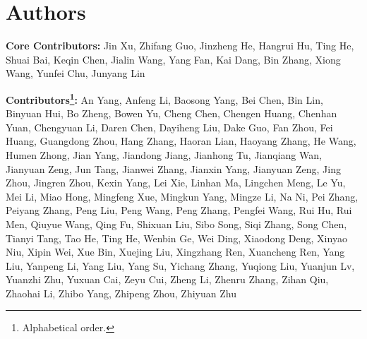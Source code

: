 \section{Authors}
\textbf{Core Contributors:} Jin Xu, Zhifang Guo, Jinzheng He, Hangrui Hu, Ting He, Shuai Bai, Keqin Chen, Jialin Wang, Yang Fan, Kai Dang, Bin Zhang, Xiong Wang, Yunfei Chu, Junyang Lin

\textbf{Contributors\footnote{Alphabetical order.}:} An Yang, Anfeng Li, Baosong Yang, Bei Chen, Bin Lin, Binyuan Hui, Bo Zheng, Bowen Yu, Cheng Chen, Chengen Huang, Chenhan Yuan, Chengyuan Li, Daren Chen, Dayiheng Liu, Dake Guo, Fan Zhou, Fei Huang, Guangdong Zhou, Hang Zhang, Haoran Lian, Haoyang Zhang, He Wang, Humen Zhong, Jian Yang, Jiandong Jiang, Jianhong Tu, Jianqiang Wan, Jianyuan Zeng, Jun Tang, Jianwei Zhang, Jianxin Yang, Jianyuan Zeng, Jing Zhou, Jingren Zhou, Kexin Yang, Lei Xie, Linhan Ma, Lingchen Meng, Le Yu, Mei Li, Miao Hong, Mingfeng Xue, Mingkun Yang, Mingze Li, Na Ni, Pei Zhang, Peiyang Zhang, Peng Liu, Peng Wang, Peng Zhang, Pengfei Wang, Rui Hu, Rui Men, Qiuyue Wang, Qing Fu, Shixuan Liu, Sibo Song, Siqi Zhang, Song Chen, Tianyi Tang, Tao He, Ting He, Wenbin Ge, Wei Ding, Xiaodong Deng, Xinyao Niu, Xipin Wei, Xue Bin, Xuejing Liu, Xingzhang Ren, Xuancheng Ren, Yang Liu, Yanpeng Li, Yang Liu, Yang Su, Yichang Zhang, Yuqiong Liu, Yuanjun Lv, Yuanzhi Zhu, Yuxuan Cai, Zeyu Cui, Zheng Li, Zhenru Zhang, Zihan Qiu, Zhaohai Li, Zhibo Yang, Zhipeng Zhou, Zhiyuan Zhu
